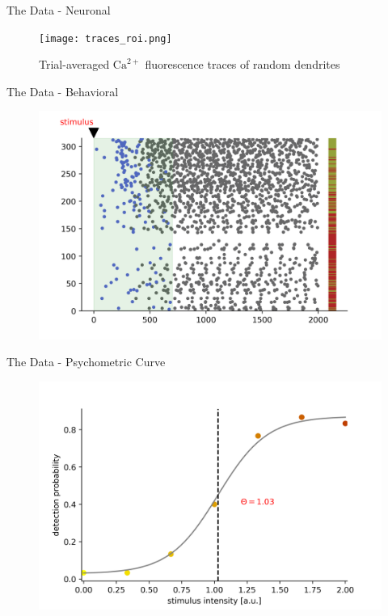 \documentclass[10pt]{beamer}
\begin{document}
\begin{frame}[fragile]{The Data - Neuronal}
	\begin{center}
	\begin{figure}
	\caption*{Trial-averaged $\text{Ca}^{2+}$ fluorescence traces of random dendrites}
      \texttt{[image: traces\_roi.png]}
	\end{figure}
	\end{center}
\end{frame}

\begin{frame}[fragile]{The Data - Behavioral}
	\begin{center}
	\begin{figure}
      \includegraphics[width=\textwidth]{lickplot_single.png}
	\end{figure}
	\end{center}
\end{frame}

\begin{frame}[fragile]{The Data - Psychometric Curve}
\begin{center}
	\begin{figure}
      \includegraphics[width=\textwidth]{psychometric.png}
	\end{figure}
	\end{center}
	
\end{frame}
\end{document}
